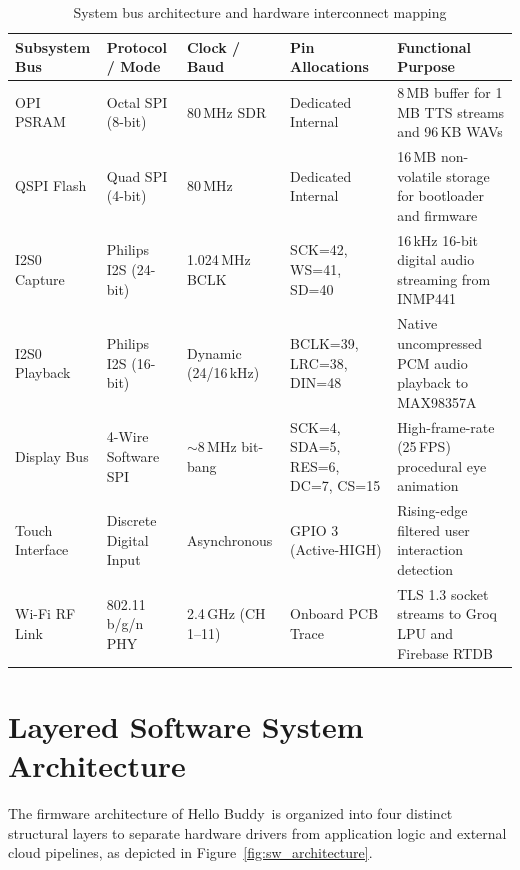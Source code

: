 \documentclass[11pt,a4paper,oneside]{report}
\newcommand{\hdr}[1]{\cellcolor{LightBlue}\textbf{#1}}
\newcommand{\ProductName}{Hello Buddy}
\begin{document}
\begin{table}[H]\centering\small
\caption{System bus architecture and hardware interconnect mapping}
\begin{tabularx}{\linewidth}{|l|l|l|l|X|}\hline
\hdr{Subsystem Bus} & \hdr{Protocol / Mode} & \hdr{Clock / Baud} & \hdr{Pin Allocations} & \hdr{Functional Purpose}\\ \hline
OPI PSRAM & Octal SPI (8-bit) & 80\,MHz SDR & Dedicated Internal & 8\,MB buffer for 1\,MB TTS streams and 96\,KB WAVs\\ \hline
QSPI Flash & Quad SPI (4-bit) & 80\,MHz & Dedicated Internal & 16\,MB non-volatile storage for bootloader and firmware\\ \hline
I2S0 Capture & Philips I2S (24-bit) & 1.024\,MHz BCLK & SCK=42, WS=41, SD=40 & 16\,kHz 16-bit digital audio streaming from INMP441\\ \hline
I2S0 Playback & Philips I2S (16-bit) & Dynamic (24/16\,kHz) & BCLK=39, LRC=38, DIN=48 & Native uncompressed PCM audio playback to MAX98357A\\ \hline
Display Bus & 4-Wire Software SPI & $\sim$8\,MHz bit-bang & SCK=4, SDA=5, RES=6, DC=7, CS=15 & High-frame-rate (25\,FPS) procedural eye animation\\ \hline
Touch Interface & Discrete Digital Input & Asynchronous & GPIO 3 (Active-HIGH) & Rising-edge filtered user interaction detection\\ \hline
Wi-Fi RF Link & 802.11 b/g/n PHY & 2.4\,GHz (CH 1--11) & Onboard PCB Trace & TLS 1.3 socket streams to Groq LPU and Firebase RTDB\\ \hline
\end{tabularx}
\end{table}

\section{Layered Software System Architecture}\label{sec:sw_arch}
The firmware architecture of \ProductName\ is organized into four distinct structural layers to separate hardware drivers from application logic and external cloud pipelines, as depicted in Figure~\ref{fig:sw_architecture}.
\end{document}
